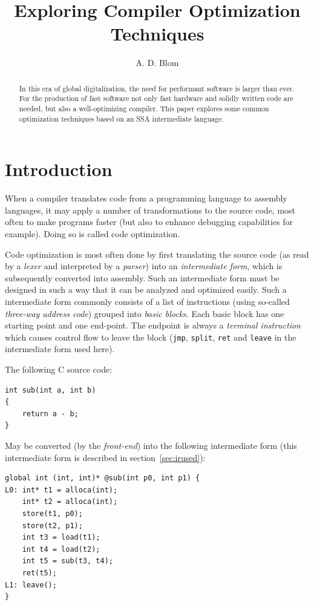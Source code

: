 \documentclass[12pt, a4paper]{article}
\title{Exploring Compiler Optimization Techniques}
\author{A. D. Blom}
\date{}
\begin{document}
 \sloppy
  \maketitle
  \begin{abstract}
In this era of global digitalization, the need for performant software is larger
than ever. For the production of fast software not only 
fast hardware and solidly written code are needed, but also a well-optimizing 
compiler. This paper explores some common optimization techniques based on an 
SSA intermediate language.
  \end{abstract}

  \section{Introduction}
When a compiler translates code from a programming language to assembly languages,
it may apply a number of transformations to the source code, most often to make
programs faster (but also to enhance debugging capabilities for example). Doing
so is called code optimization.

Code optimization is most often done by first translating the source code
(as read by a \textit{lexer} and interpreted by a \textit{parser}) into an
\textit{intermediate form}, which is subsequently converted into
assembly.\cite[chapter~2]{dragon}
Such an intermediate form must be designed in such a way that it can be analyzed and
optimized easily. Such a intermediate form commonly consists of a
list of instructions (using so-called \textit{three-way address code}) grouped
into \textit{basic blocks}. Each basic block has one starting point and one
end-point. The endpoint is always a \textit{terminal instruction}
which causes control flow to leave the block (\verb+jmp+, \verb+split+, \verb+ret+
and \verb+leave+ in the intermediate form used here).

The following C source code:

\begin{lstlisting}
int sub(int a, int b)
{
	return a - b;
}
\end{lstlisting}

May be converted (by the \textit{front-end}) into the following intermediate form
(this intermediate form is described in section~\ref{sec:irused}):

\begin{lstlisting}
global int (int, int)* @sub(int p0, int p1) {
L0:	int* t1 = alloca(int);
	int* t2 = alloca(int);
	store(t1, p0);
	store(t2, p1);
	int t3 = load(t1);
	int t4 = load(t2);
	int t5 = sub(t3, t4);
	ret(t5);
L1:	leave();
}
\end{lstlisting}
\end{document}
